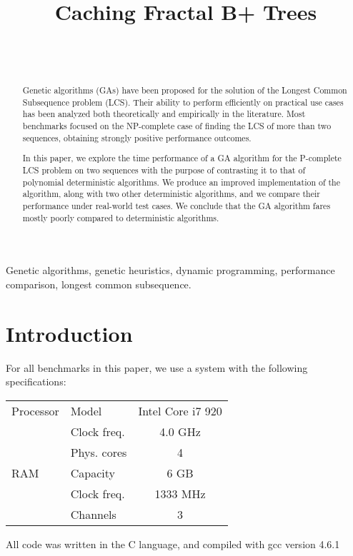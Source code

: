 \documentclass{article}
\begin{document}
\title{Caching Fractal B+ Trees}

\author{ \hfill {}\\ 
\AND
        \hfill {}\\
}

\maketitle

\begin{abstract}


Genetic algorithms (GAs) have been proposed for the solution of the Longest Common Subsequence problem (LCS).
Their ability to perform efficiently on practical use cases has been analyzed both theoretically and empirically in the literature.
Most benchmarks focused on the NP-complete case of finding the LCS of more than two sequences,
obtaining strongly positive performance outcomes.

In this paper, we explore the time performance of a GA algorithm for the P-complete LCS problem on two sequences
with the purpose of contrasting it to that of polynomial deterministic algorithms.
We produce an improved implementation of the algorithm, along with two other deterministic algorithms, and we compare their
performance under real-world test cases.
We conclude that the GA algorithm fares mostly poorly compared to deterministic algorithms.
\end{abstract}

\begin{keywords}
Genetic algorithms,
genetic heuristics,
dynamic programming,
performance comparison,
longest common subsequence.
\end{keywords}

\section{Introduction}
For all benchmarks in this paper, we use a system with the following specifications:

\begin{tabular}{l|l|c}
	Processor & Model & Intel Core i7 920 \\
	& Clock freq. & 4.0 GHz \\
	& Phys. cores & 4 \\
\hline
	RAM & Capacity & 6 GB \\
	& Clock freq. & 1333 MHz \\
	& Channels & 3
\end{tabular}

All code was written in the C language, and compiled with gcc version 4.6.1

\small



\end{document}
